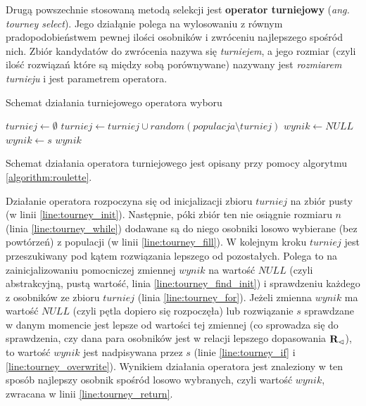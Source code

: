 \documentclass[./FM_mgr.tex]{subfiles}
\begin{document}
Drugą powszechnie stosowaną metodą selekcji jest \textbf{operator turniejowy} (\emph{ang. tourney select}).
Jego działąnie polega na wylosowaniu z równym pradopodobieństwem pewnej ilości osobników i zwróceniu najlepszego spośród nich.
Zbiór kandydatów do zwrócenia nazywa się \emph{turniejem}, a jego rozmiar (czyli ilość rozwiązań które są między sobą porównywane) nazywany jest \emph{rozmiarem turnieju} i jest parametrem operatora.

\begin{algorithm}[h]
	\caption{Schemat działania turniejowego operatora wyboru \label{algorithm:tourney}}
	\begin{algorithmic}[1]
		\Start
		\Var $turniej \gets \emptyset$
		\label{line:tourney_init}
		\label{line:tourney_while}
		\State $turniej \gets turniej \cup random(populacja \setminus turniej)$
		\label{line:tourney_fill}
		\EndWhile
		\Var $wynik \gets NULL$
		\label{line:tourney_find_init}
		\label{line:tourney_for}
		\label{line:tourney_if}
		\State $wynik \gets s$
		\label{line:tourney_overwrite}
		\EndIf
		\EndFor
		\State \Return $wynik$
		\label{line:tourney_return}
		\EndOperator
	\end{algorithmic}
\end{algorithm}

Schemat działania operatora turniejowego jest opisany przy pomocy algorytmu \ref{algorithm:roulette}.

Działanie operatora rozpoczyna się od inicjalizacji zbioru $turniej$ na zbiór pusty (w linii \ref{line:tourney_init}).
Następnie, póki zbiór ten nie osiągnie rozmiaru $n$ (linia \ref{line:tourney_while}) dodawane są do niego osobniki losowo wybierane (bez powtórzeń) z populacji (w linii \ref{line:tourney_fill}).
W kolejnym kroku $turniej$ jest przeszukiwany pod kątem rozwiązania lepszego od pozostałych.
Polega to na zainicjalizowaniu pomocniczej zmiennej $wynik$ na wartość $NULL$ (czyli abstrakcyjną, pustą wartość, linia \ref{line:tourney_find_init}) i sprawdzeniu każdego z osobników ze zbioru $turniej$ (linia \ref{line:tourney_for}). 
Jeżeli zmienna $wynik$ ma wartość $NULL$ (czyli pętla dopiero się rozpoczęła) lub rozwiązanie $s$ sprawdzane w danym momencie jest lepsze od wartości tej zmiennej (co sprowadza się do sprawdzenia, czy dana para osobników jest w relacji lepszego dopasowania ${\mathbf{R}}_{\lhd}$), to wartość $wynik$ jest nadpisywana przez $s$ (linie \ref{line:tourney_if} i \ref{line:tourney_overwrite}).
Wynikiem działania operatora jest znaleziony w ten sposób najlepszy osobnik spośród losowo wybranych, czyli wartość $wynik$, zwracana w linii \ref{line:tourney_return}.
\end{document}
